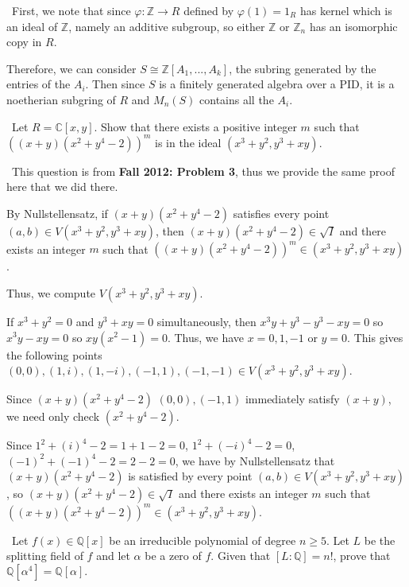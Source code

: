 \documentclass[12pt]{AlgebraQual}
\begin{document}
\begin{solution}$\,$
First, we note that since $\varphi:\mathbb{Z}\to R$ defined by $\varphi(1)=1_R$ has kernel which is an ideal of $\mathbb{Z}$, namely an additive subgroup, so either $\mathbb{Z}$ or $\mathbb{Z}_n$ has an isomorphic copy in $R$.

Therefore, we can consider $S\cong \mathbb{Z}[A_1,...,A_k]$, the subring generated by the entries of the $A_i$. Then since $S$ is a finitely generated algebra over a PID, it is a noetherian subgring of $R$ and $M_n(S)$ contains all the $A_i.$

\end{solution}
\newpage



\begin{problem} $\,$
Let $R=\mathbb{C}[x,y]$. Show that there exists a positive integer $m$ such that $((x+y)(x^2+y^4-2))^m$ is in the ideal $(x^3+y^2,y^3+xy)$.
\end{problem}


\begin{solution}$\,$
This question is from \textbf{Fall 2012: Problem 3}, thus we provide the same proof here that we did there.

By Nullstellensatz, if $(x+y)(x^2+y^4-2)$ satisfies every point $(a,b)\in V(x^3+y^2,y^3+xy)$, then $(x+y)(x^2+y^4-2)\in\sqrt{I}$ and there exists an integer $m$ such that $((x+y)(x^2+y^4-2))^m\in(x^3+y^2,y^3+xy)$.

Thus, we compute $V(x^3+y^2,y^3+xy).$

If $x^3+y^2=0$ and $y^3+xy=0$ simultaneously, then $x^3y+y^3-y^3-xy=0$ so $x^3y-xy=0$ so $xy(x^2-1)=0$. Thus, we have $x=0,1,-1$ or $y=0$. This gives the following points $(0,0),(1,i),(1,-i),(-1,1),(-1,-1)\in V(x^3+y^2,y^3+xy)$.

Since $(x+y)(x^2+y^4-2)$ $(0,0),(-1,1)$ immediately satisfy $(x+y)$, we need only check $(x^2+y^4-2)$.

Since $1^2+(i)^4-2=1+1-2=0$, $1^2+(-i)^4-2=0$, $(-1)^2+(-1)^4-2=2-2=0$, we have by Nullstellensatz that $(x+y)(x^2+y^4-2)$ is satisfied by every point $(a,b)\in V(x^3+y^2,y^3+xy)$, so $(x+y)(x^2+y^4-2)\in\sqrt{I}$ and there exists an integer $m$ such that $((x+y)(x^2+y^4-2))^m\in(x^3+y^2,y^3+xy)$.
\end{solution}
\newpage




\begin{problem} $\,$
Let $f(x)\in\mathbb{Q}[x]$ be an irreducible polynomial of degree $n\ge5$. Let $L$ be the splitting field of $f$ and let $\alpha$ be a zero of $f$. Given that $[L:\mathbb{Q}]=n!$, prove that $\mathbb{Q}[\alpha^4]=\mathbb{Q}[\alpha].$
\end{problem}
\end{document}
